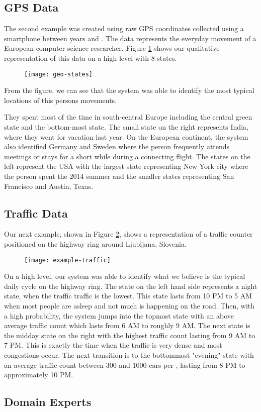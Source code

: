 \subsection{GPS Data }

The second example was created using raw GPS coordinates collected using a smartphone between years  and .
The data represents the everyday movement of a European computer science researcher. Figure \ref{fig:example-geo}
shows our qualitative representation of this data on a high level with 8 states.

\begin{figure}[h!]
	\centering
	\texttt{[image: geo-states]}
	\caption{}
	\label{fig:example-geo}
\end{figure}

From the figure, we can see that the system was able to identify the most typical locations of this persons
movements.

They spent most of the time in south-central Europe including the central green state and the bottom-most state. The small state on the right represents India, where they went for vacation last year. On the European continent, the system
also identified Germany and Sweden where the person frequently attends meetings or stays for a short while
during a connecting flight. The states on the left represent the USA with the largest state representing New
York city where the person spent the 2014 summer and the smaller states representing San Francisco and Austin,
Texas.

\subsection{Traffic Data}

Our next example, shown in Figure \ref{fig:example-traffic}, shows a representation of a traffic counter positioned on the highway ring around Ljubljana, Slovenia.
\begin{figure}[h!]
	\centering
	\texttt{[image: example-traffic]}
	\caption{}
	\label{fig:example-traffic}
\end{figure}
On a high level, our system was able to identify what we believe is the typical daily cycle on the highway ring.
The state on the left hand side represents a night state, when the traffic traffic is the lowest. This state
lasts from 10 PM to 5 AM when most people are asleep and not much is happening on the road. Then, with a high 
probability, the system jumps into the topmost state with an above average traffic count which lasts from 6 AM
to roughly 9 AM. The next state is the midday state on the right with the highest traffic count lasting from 9 AM
to 7 PM. This is exactly the time when the traffic is very dense and most congestions occur. The next transition
is to the bottommost "evening" state with an average traffic count between 300 and 1000 cars per ,
lasting from 8 PM to approximately 10 PM. 

\subsection{Domain Experts}